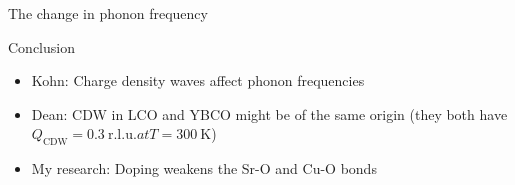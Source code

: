 \documentclass{beamer}
\begin{document}
\begin{frame}{The change in phonon frequency}
\end{frame}

\begin{frame}{Conclusion}
\begin{itemize}
\item Kohn: Charge density waves affect phonon frequencies
\item Dean: CDW in LCO and YBCO might be of the same origin (they both have $Q_{\text{CDW}} = 0.3~\mathrm{r.l.u.} at T = 300~\mathrm{K}$)
\item My research: Doping weakens the Sr-O and Cu-O bonds
\end{itemize}
\end{frame}
\end{document}
